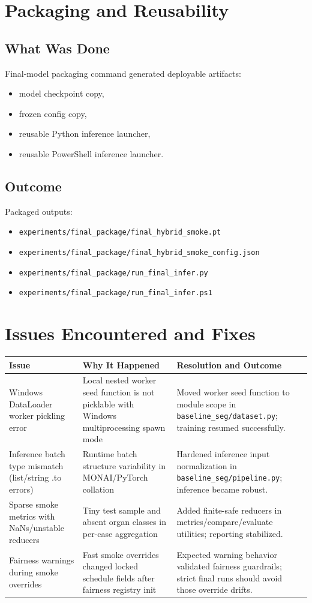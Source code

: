 \documentclass[11pt,a4paper]{article}
\begin{document}
\section{Packaging and Reusability}
\subsection{What Was Done}
Final-model packaging command generated deployable artifacts:
\begin{itemize}[leftmargin=1.5em]
  \item model checkpoint copy,
  \item frozen config copy,
  \item reusable Python inference launcher,
  \item reusable PowerShell inference launcher.
\end{itemize}

\subsection{Outcome}
Packaged outputs:
\begin{itemize}[leftmargin=1.5em]
  \item \texttt{experiments/final\_package/final\_hybrid\_smoke.pt}
  \item \texttt{experiments/final\_package/final\_hybrid\_smoke\_config.json}
  \item \texttt{experiments/final\_package/run\_final\_infer.py}
  \item \texttt{experiments/final\_package/run\_final\_infer.ps1}
\end{itemize}

\section{Issues Encountered and Fixes}
\begin{longtable}{p{}p{}p{}}
\toprule
Issue & Why It Happened & Resolution and Outcome \\
\midrule
Windows DataLoader worker pickling error & Local nested worker seed function is not picklable with Windows multiprocessing spawn mode & Moved worker seed function to module scope in \texttt{baseline\_seg/dataset.py}; training resumed successfully. \\
Inference batch type mismatch (list/string .to errors) & Runtime batch structure variability in MONAI/PyTorch collation & Hardened inference input normalization in \texttt{baseline\_seg/pipeline.py}; inference became robust. \\
Sparse smoke metrics with NaNs/unstable reducers & Tiny test sample and absent organ classes in per-case aggregation & Added finite-safe reducers in metrics/compare/evaluate utilities; reporting stabilized. \\
Fairness warnings during smoke overrides & Fast smoke overrides changed locked schedule fields after fairness registry init & Expected warning behavior validated fairness guardrails; strict final runs should avoid those override drifts. \\
\bottomrule
\end{longtable}
\end{document}
